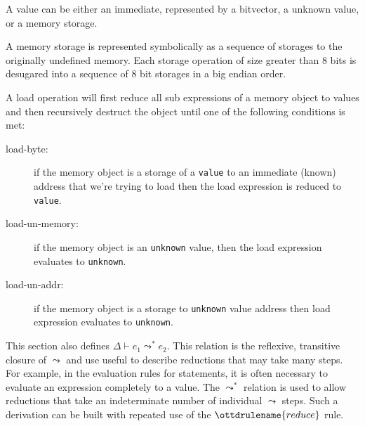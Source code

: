 \documentclass[11pt]{article}
\begin{document}
A value can be either an immediate, represented by a bitvector, a
unknown value, or a memory storage.

A memory storage is represented symbolically as a sequence of
storages to the originally undefined memory. Each storage
operation of size greater than 8 bits is desugared into a sequence of
8 bit storages in a big endian order.

A load operation will first reduce all sub expressions of a memory
object to values and then recursively destruct the object until one of
the following conditions is met:


\begin{description}
\item[load-byte:] if the memory object is a storage of a \verb|value|
  to an immediate (known) address that we're trying to load then the
  load expression is reduced to \verb|value|.
\item[load-un-memory:] if the memory object is an \verb|unknown| value,
  then the load expression evaluates to \verb|unknown|.
\item[load-un-addr:] if the memory object is a storage to
  \verb|unknown| value address then load expression evaluates to
  \verb|unknown|.
\end{description}

This section also defines $\Delta \vdash e_1 \leadsto^{*} e_2$.  This relation
is the reflexive, transitive closure of $\leadsto$ and use useful to describe
reductions that may take many steps.  For example, in the evaluation rules for
statements, it is often necessary to evaluate an expression completely to a
value.  The $\leadsto^{*}$ relation is used to allow reductions that take an
indeterminate number of individual $\leadsto$ steps.  Such a derivation can be
built with repeated use of the $\ottdrulename{reduce}$ rule.

\medskip

\ottdefnsreduceXXexp

\ottdefnshelpers

\ottdefnsmultistepXXexp
\end{document}
